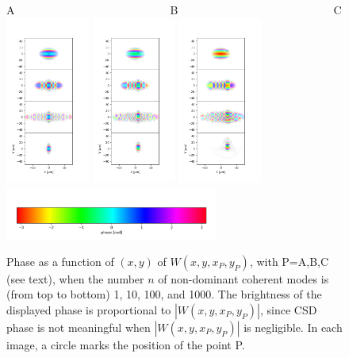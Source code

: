 \documentclass{iucr}              %
\begin{document}
\begin{figure}
\caption{Phase as a function of $(x,y)$ of $W(x,y,x_P,y_P)$, with P=A,B,C (see text), when the number $n$ of non-dominant coherent modes is (from top to bottom) 1, 10, 100, and 1000. The brightness of the displayed phase is proportional to $|W(x,y,x_P,y_P)|$, since CSD phase is not meaningful when $|W(x,y,x_P,y_P)|$ is negligible. In each image, a circle marks the position of the point P.}
A~~~~~~~~~~~~~~~~~~~~~~~~~~~~B~~~~~~~~~~~~~~~~~~~~~~~~~~~~C\\
\includegraphics[width=2.75cm]{Figures/vx_id16a_A.png}
\includegraphics[width=2.75cm]{Figures/vx_id16a_B.png}
\includegraphics[width=2.75cm]{Figures/vx_id16a_C.png}
\includegraphics[width=7cm]{Figures/color_bar.png}
\label{pointP}
\end{figure}
\end{document}
